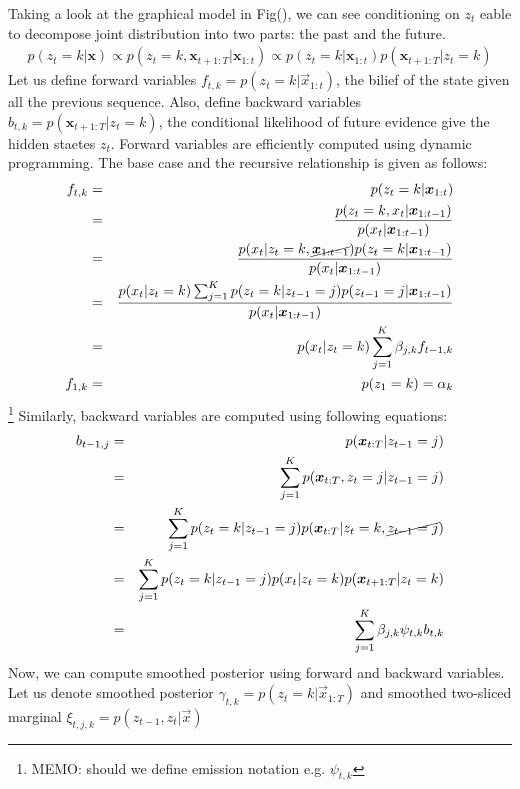 Taking a look at the graphical model in Fig(), we can see conditioning on $z_t$ eable to decompose joint distribution into two parts: the past and the future. 
\begin{eqnarray}
p(z_t= k| \mathbf{x}) \propto p(z_t=k, \mathbf{x}_{t+1:T}| \mathbf{x}_{1:t})  \propto p(z_t=k|\mathbf{x}_{1:t}) p(\mathbf{x}_{t+1:T}|z_t=k)
\end{eqnarray}
Let us define forward variables $f_{t,k} = p(z_t = k | \vec{x}_{1:t})$, the bilief of the state given all the previous sequence. 
Also, define backward variables $b_{t,k} = p(\mathbf{x}_{t+1:T}|z_t=k)$, the conditional likelihood of future evidence give the hidden staetes $z_t$.
Forward variables are efficiently computed using dynamic programming. The base case and the recursive relationship is given as follows:
\begin{eqnarray}
  f_{t,k} &=& p(z_t = k | \vec{x}_{1:t}) \nonumber \\
          &=& \frac{p(z_t = k, x_t|\vec{x}_{1:t-1})}  {p(x_t|\vec{x}_{1:t-1})} \nonumber \\  
          &=& \frac{p(x_t|z_t=k, \cancel{\vec{x}_{1:t-1}})p(z_t = k|\vec{x}_{1:t-1})}  {p(x_t|\vec{x}_{1:t-1})} \nonumber \\  
          &=& \frac{p(x_t|z_t=k) \sum_{j=1}^K p(z_t = k | z_{t-1} = j)p(z_{t-1} = j|\vec{x}_{1:t-1})}  {p(x_t|\vec{x}_{1:t-1})} \nonumber \\  
          &=& p(x_t| z_t = k) \sum_{j=1}^K  \beta_{j,k} f_{t-1,k} \\
  f_{1, k} &=& p(z_1 = k) = \alpha_k
\end{eqnarray}
\footnote{MEMO: should we define emission notation e.g. $\psi_{t,k}$}
Similarly, backward variables are computed using following equations:
\begin{eqnarray}
b_{t-1,j} &=& p(\vec{x}_{t:T}|z_{t-1}=j) \nonumber \\
          &=& \sum_{j=1}^K p(\vec{x}_{t:T}, z_{t}=j| z_{t-1}=j) \nonumber \\
          &=& \sum_{j=1}^K p(z_{t}=k| z_{t-1}=j) p(\vec{x}_{t:T}| z_t=k, \cancel{z_{t-1}=j}) \nonumber \\
          &=& \sum_{j=1}^K p(z_{t}=k| z_{t-1}=j) p(x_t|z_t=k) p(\vec{x}_{t+1:T}| z_t=k) \nonumber \\
          &=& \sum_{j=1}^K \beta_{j,k} \psi_{t,k} b_{t,k}  
\end{eqnarray}
Now, we can compute smoothed posterior using forward and backward variables. Let us denote smoothed posterior $\gamma_{t,k} = p(z_t = k|\vec{x}_{1:T})$ and smoothed two-sliced marginal $\xi_{t,j,k} = p(z_{t-1},z_t| \vec{x})$

